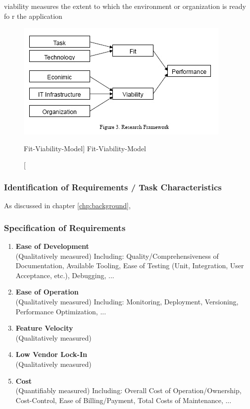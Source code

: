 viability  measures the extent to which the environment or organization is ready fo r the application



\begin{figure}[ht]
    \includegraphics[width=0.7\linewidth]{images/methodology/fvm.jpg}\centering
    \caption
    [Fit-Viability-Model]
    {Fit-Viability-Model \cite{Liang2007AdoptionModel}}
\end{figure}


\subsubsection{Identification of Requirements / Task Characteristics}

As discussed in chapter \ref{chp:background},

\subsubsection{Specification of Requirements}

\begin{enumerate}
    \item \textbf{Ease of Development}\\
        (Qualitatively measured) Including: Quality/Comprehensiveness of Documentation, Available Tooling, Ease of Testing (Unit, Integration, User Acceptance, etc.), Debugging, ...
    \item \textbf{Ease of Operation}\\
        (Qualitatively measured) Including: Monitoring, Deployment, Versioning, Performance Optimization, ...
    \item \textbf{Feature Velocity}\\
        (Qualitatively measured) 
    \item \textbf{Low Vendor Lock-In}\\
        (Qualitatively measured) 
    \item \textbf{Cost}\\
        (Quantifiably measured) Including: Overall Cost of Operation/Ownership, Cost-Control, Ease of Billing/Payment, Total Costs of Maintenance, ...
\end{enumerate}



